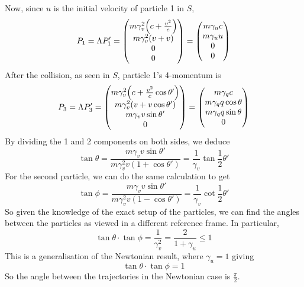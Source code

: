 Now, since $u$ is the initial velocity of particle 1 in $S$,
\[ P_1 = \Lambda P_1' = \begin{pmatrix}
    m\gamma_v^2 \qty(c + \frac{v^2}{c}) \\
    m\gamma_v^2 (v+v) \\
    0 \\
    0
\end{pmatrix} = \begin{pmatrix}
    m\gamma_u c \\
    m\gamma_u u \\
    0 \\
    0
\end{pmatrix} \]
After the collision, as seen in $S$, particle 1's 4-momentum is
\[ P_3 = \Lambda P_3' = \begin{pmatrix}
    m\gamma_v^2 \qty(c + \frac{v^2}{c}\cos\theta') \\
    m\gamma_v^2 \qty(v + v\cos\theta') \\
    m\gamma_v v\sin\theta' \\
    0
\end{pmatrix} = \begin{pmatrix}
    m\gamma_q c \\
    m\gamma_q q\cos\theta \\
    m\gamma_q q\sin\theta \\
    0
\end{pmatrix} \]
By dividing the 1 and 2 components on both sides, we deduce
\[ \tan\theta = \frac{m\gamma_v v\sin\theta'}{m\gamma_v^2 v(1 + \cos\theta')} = \frac{1}{\gamma_v} \tan\frac{1}{2}\theta' \]
For the second particle, we can do the same calculation to get
\[ \tan\phi = \frac{m\gamma_v v\sin\theta'}{m\gamma_v^2 v(1 - \cos\theta')} = \frac{1}{\gamma_v} \cot\frac{1}{2}\theta' \]
So given the knowledge of the exact setup of the particles, we can find the angles between the particles as viewed in a different reference frame. In particular,
\[ \tan\theta \cdot \tan\phi = \frac{1}{\gamma_v^2} = \frac{2}{1+\gamma_u} \leq 1 \]
This is a generalisation of the Newtonian result, where $\gamma_u = 1$ giving
\[ \tan\theta \cdot \tan\phi = 1 \]
So the angle between the trajectories in the Newtonian case is $\frac{\pi}{2}$.

